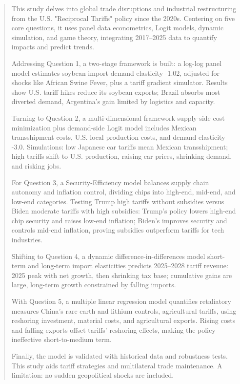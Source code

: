 \documentclass{apmcmthesis}
\begin{document}
\pagestyle{frontmatterstyle}

\begin{abstract}

This study delves into global trade disruptions and industrial restructuring from the U.S. "Reciprocal Tariffs" policy since the 2020s. Centering on five core questions, it uses panel data econometrics, Logit models, dynamic simulation, and game theory, integrating 2017–2025 data to quantify impacts and predict trends.

Addressing Question 1, a two-stage framework is built: a log-log panel model estimates soybean import demand elasticity -1.02, adjusted for shocks like African Swine Fever, plus a tariff gradient simulator. Results show U.S. tariff hikes reduce its soybean exports; Brazil absorbs most diverted demand, Argentina’s gain limited by logistics and capacity.

Turning to Question 2, a multi-dimensional framework supply-side cost minimization plus demand-side Logit model includes Mexican transshipment costs, U.S. local production costs, and demand elasticity -3.0. Simulations: low Japanese car tariffs mean Mexican transshipment; high tariffs shift to U.S. production, raising car prices, shrinking demand, and risking jobs.

For Question 3, a Security-Efficiency model balances supply chain autonomy and inflation control, dividing chips into high-end, mid-end, and low-end categories. Testing Trump high tariffs without subsidies versus Biden moderate tariffs with high subsidies: Trump’s policy lowers high-end chip security and raises low-end inflation; Biden’s improves security and controls mid-end inflation, proving subsidies outperform tariffs for tech industries.

Shifting to Question 4, a dynamic difference-in-differences model short-term and long-term import elasticities predicts 2025–2028 tariff revenue: 2025 peak with net growth, then shrinking tax base; cumulative gains are large, long-term growth constrained by falling imports.

With Question 5, a multiple linear regression model quantifies retaliatory measures China’s rare earth and lithium controls, agricultural tariffs, using reshoring investment, material costs, and agricultural exports. Rising costs and falling exports offset tariffs’ reshoring effects, making the policy ineffective short-to-medium term.

Finally, the model is validated with historical data and robustness tests. This study aids tariff strategies and multilateral trade maintenance. A limitation: no sudden geopolitical shocks are included.
\end{abstract}
\newpage
\end{document}
